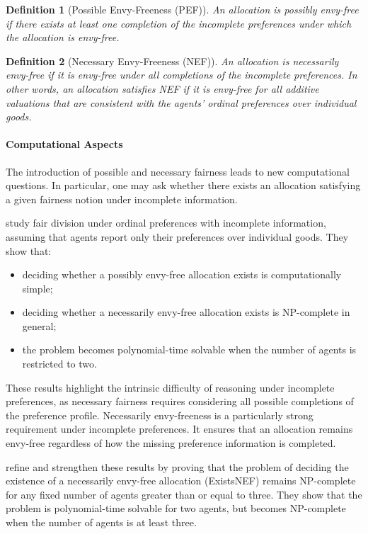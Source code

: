 \documentclass{article}
\newtheorem{definition}{Definition}
\begin{document}
\begin{definition}[Possible Envy-Freeness (PEF)]
An allocation is possibly envy-free if there exists at least one completion of the incomplete preferences under which the allocation is envy-free.
\end{definition}

\begin{definition}[Necessary Envy-Freeness (NEF)]
An allocation is necessarily envy-free if it is envy-free under all completions of the incomplete preferences.
In other words, an allocation satisfies NEF if it is envy-free for all additive valuations that are consistent with the agents' ordinal preferences over individual goods.
\end{definition}


\paragraph{Computational Aspects} The introduction of possible and necessary fairness leads to new computational questions. 
In particular, one may ask whether there exists an allocation satisfying a given fairness notion under incomplete information.

\cite{bouveret2010fair} study fair division under ordinal preferences with incomplete information, assuming that agents report only their preferences over individual goods. 
They show that:
\begin{itemize}
    \item deciding whether a possibly envy-free allocation exists is computationally simple;
    \item deciding whether a necessarily envy-free allocation exists is NP-complete in general;
    \item the problem becomes polynomial-time solvable when the number of agents is restricted to two.
\end{itemize}

These results highlight the intrinsic difficulty of reasoning under incomplete preferences, as necessary fairness requires considering all possible completions of the preference profile.
Necessarily envy-freeness is a particularly strong requirement under incomplete preferences.
It ensures that an allocation remains envy-free regardless of how the missing preference information is completed.

\cite{aziz2024computational} refine and strengthen these results by proving that the problem of deciding the existence of a necessarily envy-free allocation (ExistsNEF) remains NP-complete for any fixed number of agents greater than or equal to three. 
They show that the problem is polynomial-time solvable for two agents, but becomes NP-complete when the number of agents is at least three.
\end{document}
